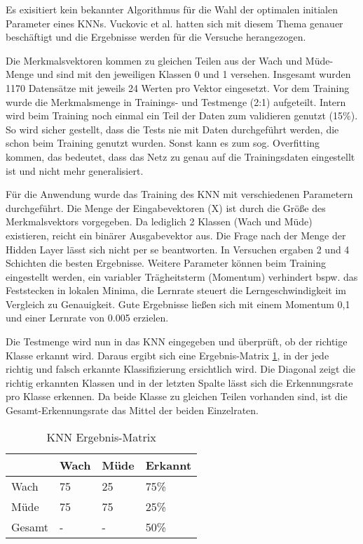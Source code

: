 Es exisitiert kein bekannter Algorithmus für die Wahl der optimalen initialen Parameter eines KNNs. Vuckovic et al. \cite{Vuckovic2002349} hatten sich mit diesem Thema genauer beschäftigt und die Ergebnisse werden für die Versuche herangezogen.

Die Merkmalsvektoren kommen zu gleichen Teilen aus der Wach und Müde-Menge und sind mit den jeweiligen Klassen 0 und 1 versehen. Insgesamt wurden 1170 Datensätze mit jeweils 24 Werten pro Vektor eingesetzt. Vor dem Training wurde die Merkmalsmenge in Trainings- und Testmenge (2:1) aufgeteilt. Intern wird beim Training noch einmal ein Teil der Daten zum validieren genutzt (15\%). So wird sicher gestellt, dass die Tests nie mit Daten durchgeführt werden, die schon beim Training genutzt wurden. Sonst kann es zum sog. Overfitting kommen, das bedeutet, dass das Netz zu genau auf die Trainingsdaten eingestellt ist und nicht mehr generalisiert.

Für die Anwendung wurde das Training des KNN mit verschiedenen Parametern durchgeführt. Die Menge der Eingabevektoren (X) ist durch die Größe des Merkmalsvektors vorgegeben. Da lediglich 2 Klassen (Wach und Müde) existieren, reicht ein binärer Ausgabevektor aus. Die Frage nach der Menge der Hidden Layer lässt sich nicht per se beantworten. In Versuchen ergaben 2 und 4 Schichten die besten Ergebnisse. Weitere Parameter können beim Training eingestellt werden, ein variabler Trägheitsterm (Momentum) verhindert bspw. das Feststecken in lokalen Minima, die Lernrate steuert die Lerngeschwindigkeit im Vergleich zu Genauigkeit. Gute Ergebnisse ließen sich mit einem Momentum 0,1 und einer Lernrate von 0.005 erzielen.

Die Testmenge wird nun in das KNN eingegeben und überprüft, ob der richtige Klasse erkannt wird. Daraus ergibt sich eine Ergebnis-Matrix \ref{tab:ann_results}, in der jede richtig und falsch erkannte Klassifizierung ersichtlich wird. Die Diagonal zeigt die richtig erkannten Klassen und in der letzten Spalte lässt sich die Erkennungsrate pro Klasse erkennen. Da beide Klasse zu gleichen Teilen vorhanden sind, ist die  Gesamt-Erkennungsrate das Mittel der beiden Einzelraten.

\begin{table}[t]
 \centering
 \caption{KNN Ergebnis-Matrix}
 \begin{tabular}{l|lll}
   & Wach & Müde & Erkannt \\ \hline
  Wach & 75 & 25 & 75\%\\  
  Müde & 75 & 75 & 25\%\\ 
  Gesamt & - & - & 50\%\\ 
 \end{tabular}
 \label{tab:ann_results}
\end{table}